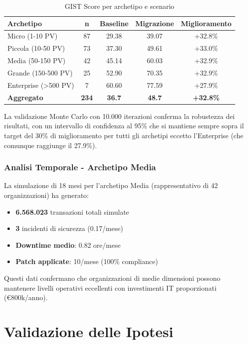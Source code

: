 \begin{table}[h!]
\centering
\caption{GIST Score per archetipo e scenario}
\begin{tabular}{|l|c|c|c|c|}
\hline
\textbf{Archetipo} & \textbf{n} & \textbf{Baseline} & \textbf{Migrazione} & \textbf{Miglioramento} \\
\hline
Micro (1-10 PV) & 87 & 29.38 & 39.07 & +32.8\% \\
Piccola (10-50 PV) & 73 & 37.30 & 49.61 & +33.0\% \\
Media (50-150 PV) & 42 & 45.14 & 60.03 & +32.9\% \\
Grande (150-500 PV) & 25 & 52.90 & 70.35 & +32.9\% \\
Enterprise (>500 PV) & 7 & 60.60 & 77.59 & +27.9\% \\
\hline
\textbf{Aggregato} & \textbf{234} & \textbf{36.7} & \textbf{48.7} & \textbf{+32.8\%} \\
\hline
\end{tabular}
\end{table}

La validazione Monte Carlo con 10.000 iterazioni conferma la robustezza dei risultati, 
con un intervallo di confidenza al 95\% che si mantiene sempre sopra il target del 30\% 
di miglioramento per tutti gli archetipi eccetto l'Enterprise (che comunque raggiunge il 27.9\%).

\subsubsection{Analisi Temporale - Archetipo Media}

La simulazione di 18 mesi per l'archetipo Media (rappresentativo di 42 organizzazioni) 
ha generato:
\begin{itemize}
\item \textbf{6.568.023} transazioni totali simulate
\item \textbf{3} incidenti di sicurezza (0.17/mese)
\item \textbf{Downtime medio}: 0.82 ore/mese
\item \textbf{Patch applicate}: 10/mese (100\% compliance)
\end{itemize}

Questi dati confermano che organizzazioni di medie dimensioni possono mantenere 
livelli operativi eccellenti con investimenti IT proporzionati (€800k/anno).

\section{Validazione delle Ipotesi}

